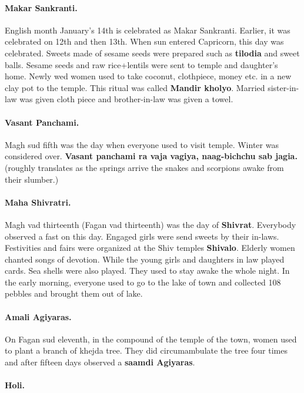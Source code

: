 \paragraph{Makar Sankranti.} English month January's 14th is celebrated as Makar
Sankranti. Earlier, it was celebrated on 12th and then 13th. When sun entered
Capricorn, this day was celebrated. Sweets made of sesame seeds were prepared
such as \textbf{tilodia} and sweet balls. Sesame seeds and raw rice+lentils were
sent to temple and daughter's home. Newly wed women used to take coconut,
clothpiece, money etc. in a new clay pot to the temple. This ritual was called
\textbf{Mandir kholyo}. Married sister-in-law was given cloth piece and
brother-in-law was given a towel.
\paragraph{Vasant Panchami.} Magh sud fifth was the day when everyone used to
visit temple. Winter was considered over. \textbf{Vasant panchami ra vaja
vagiya, naag-bichchu sab jagia.} (roughly translates as the springs arrive the
snakes and scorpions awake from their slumber.)
\paragraph{Maha Shivratri.} Magh vad thirteenth (Fagan vad thirteenth) was the
day of \textbf{Shivrat}. Everybody observed a fast on this day. Engaged girls
were send sweets by their in-laws. Festivities and fairs were organized at the
Shiv temples \textbf{Shivalo}. Elderly women chanted songs of devotion. While
the young girls and daughters in law played cards. Sea shells were also played.
They used to stay awake the whole night. In the early morning, everyone used to
go to the lake of town and collected 108 pebbles and brought them out of lake. 
\paragraph{Amali Agiyaras.} On Fagan sud eleventh, in the compound of the temple
of the town, women used to plant a branch of khejda tree. They did
circumambulate the tree four times and after fifteen days observed a
\textbf{saamdi Agiyaras}.
\paragraph{Holi.} 
